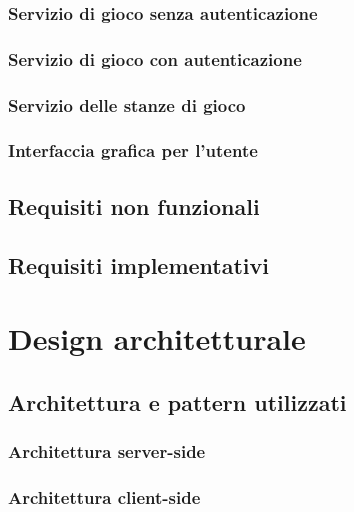             \subsubsection[NoAutenticazion]{\large {Servizio di gioco senza autenticazione}\label{subsub:requirements:noauth}}
            \subsubsection[Autenticazion]{\large {Servizio di gioco con autenticazione}\label{subsub:requirements:auth}}
            \subsubsection[Stanze di gioco]{\large {Servizio delle stanze di gioco}\label{subsub:requirements:lobby}}
            \subsubsection[Interfaccia utente]{\large {Interfaccia grafica per l'utente}\label{subsub:requirements:gui}}
        \subsection {Requisiti non funzionali}\label{subsec:requirements:notFunctional}
        \subsection {Requisiti implementativi}\label{subsec:requirements:implementative}

   \clearpage

    \setcounter{figure}{0}
    \section{Design architetturale}\label{sec:design}
        \subsection[Architettura]{Architettura e pattern utilizzati}\label{subsec:architecture}
            \subsubsection{Architettura server-side}\label{subsub:architecture:server}
            \subsubsection{Architettura client-side}\label{subsub:architecture:client}
